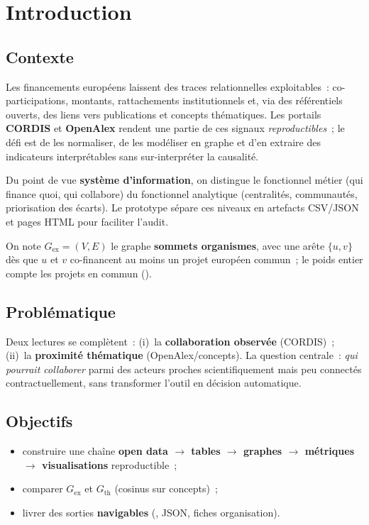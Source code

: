 \documentclass[12pt,a4paper,oneside]{article}
\begin{document}
\clearpage

\tableofcontents
\clearpage

\pagestyle{fancy}

\section{Introduction}

\subsection{Contexte}
Les financements européens laissent des traces relationnelles exploitables~: co-participations, montants, rattachements institutionnels et, via des référentiels ouverts, des liens vers publications et concepts thématiques. Les portails \textbf{CORDIS} et \textbf{OpenAlex} rendent une partie de ces signaux \emph{reproductibles}~; le défi est de les normaliser, de les modéliser en graphe et d'en extraire des indicateurs interprétables sans sur-interpréter la causalité.

Du point de vue \textbf{système d'information}, on distingue le fonctionnel métier (qui finance quoi, qui collabore) du fonctionnel analytique (centralités, communautés, priorisation des écarts). Le prototype sépare ces niveaux en artefacts CSV/JSON et pages HTML pour faciliter l'audit.

\begin{defbox}
On note $G_{\mathrm{ex}}=(V,E)$ le graphe \textbf{sommets organismes}, avec une arête $\{u,v\}$ dès que $u$ et $v$ co-financent au moins un projet européen commun~; le poids entier compte les projets en commun ().
\end{defbox}

\subsection{Problématique}
Deux lectures se complètent~: (i)~la \textbf{collaboration observée} (CORDIS)~; (ii)~la \textbf{proximité thématique} (OpenAlex/concepts). La question centrale~: \emph{qui pourrait collaborer} parmi des acteurs proches scientifiquement mais peu connectés contractuellement, sans transformer l'outil en décision automatique.

\subsection{Objectifs}
\begin{itemize}[nosep]
  \item construire une chaîne \textbf{open data $\rightarrow$ tables $\rightarrow$ graphes $\rightarrow$ métriques $\rightarrow$ visualisations} reproductible~;
  \item comparer $G_{\mathrm{ex}}$ et $G_{\mathrm{th}}$ (cosinus sur concepts)~;
  \item livrer des sorties \textbf{navigables} (, JSON, fiches organisation).
\end{itemize}
\end{document}
